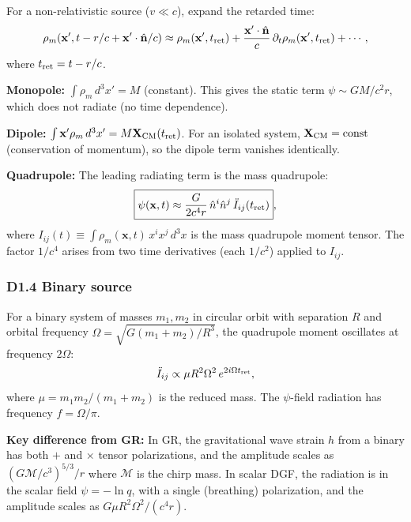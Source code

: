 \documentclass[reprint]{revtex4-2}
\begin{document}
For a non-relativistic source ($v \ll c$), expand the retarded time:
\begin{equation}
\rho_m(\mathbf{x}', t - r/c + \mathbf{x}'\cdot\hat{\mathbf{n}}/c) \approx \rho_m(\mathbf{x}', t_{\rm ret}) + \frac{\mathbf{x}'\cdot\hat{\mathbf{n}}}{c}\,\partial_t\rho_m(\mathbf{x}', t_{\rm ret}) + \cdots,
\end{equation}
where $t_{\rm ret} = t - r/c$.

\textbf{Monopole:} $\int\rho_m\,d^3x' = M$ (constant). This gives the static term $\psi \sim GM/c^2 r$, which does not radiate (no time dependence).

\textbf{Dipole:} $\int \mathbf{x}'\rho_m\,d^3x' = M\mathbf{X}_{\rm CM}(t_{\rm ret})$. For an isolated system, $\mathbf{X}_{\rm CM} = \text{const}$ (conservation of momentum), so the dipole term vanishes identically.

\textbf{Quadrupole:} The leading radiating term is the mass quadrupole:
\begin{equation}
\boxed{\psi(\mathbf{x},t) \approx \frac{G}{2c^4 r}\,\hat{n}^i\hat{n}^j\,\ddot{I}_{ij}(t_{\rm ret})},
\label{eq:quadrupole}
\end{equation}
where $I_{ij}(t) \equiv \int \rho_m(\mathbf{x},t)\,x^i x^j\,d^3x$ is the mass quadrupole moment tensor. The factor $1/c^4$ arises from two time derivatives (each $1/c^2$) applied to $I_{ij}$.

\subsubsection{D1.4 Binary source}

For a binary system of masses $m_1, m_2$ in circular orbit with separation $R$ and orbital frequency $\Omega = \sqrt{G(m_1+m_2)/R^3}$, the quadrupole moment oscillates at frequency $2\Omega$:
\begin{equation}
\ddot{I}_{ij} \propto \mu R^2\Omega^2\,e^{2i\Omega t_{\rm ret}},
\end{equation}
where $\mu = m_1 m_2/(m_1+m_2)$ is the reduced mass. The $\psi$-field radiation has frequency $f = \Omega/\pi$.

\textbf{Key difference from GR:} In GR, the gravitational wave strain $h$ from a binary has both $+$ and $\times$ tensor polarizations, and the amplitude scales as $(G\mathcal{M}/c^3)^{5/3}/r$ where $\mathcal{M}$ is the chirp mass. In scalar DGF, the radiation is in the scalar field $\psi = -\ln q$, with a single (breathing) polarization, and the amplitude scales as $G\mu R^2\Omega^2/(c^4 r)$.
\end{document}
